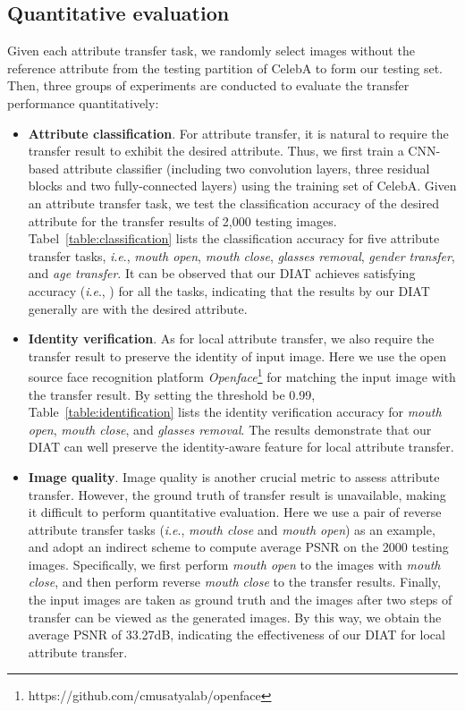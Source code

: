 \documentclass[journal]{IEEEtran}
\newcommand{\ie}{\textit{i}.\textit{e}.}
\begin{document}
\subsection{Quantitative evaluation}
Given each attribute transfer task, we randomly select  images without the reference attribute from the testing partition of CelebA to form our testing set.
Then, three groups of experiments are conducted to evaluate the transfer performance quantitatively:
\begin{itemize}
  \item \textbf{Attribute classification}. For attribute transfer, it is natural to require the transfer result to exhibit the desired attribute.
Thus, we first train a CNN-based attribute classifier (including two convolution layers, three residual blocks and two fully-connected layers) using the training set of CelebA.
Given an attribute transfer task, we test the classification accuracy of the desired attribute for the transfer results of 2,000 testing images.
Tabel~\ref{table:classification} lists the classification accuracy for five attribute transfer tasks, \ie, \emph{mouth open}, \emph{mouth close}, \emph{glasses removal}, \emph{gender transfer}, and \emph{age transfer}.
It can be observed that our DIAT achieves satisfying accuracy (\ie, ) for all the tasks, indicating that the results by our DIAT generally are with the desired attribute.
\item \textbf{Identity verification}. As for local attribute transfer, we also require the transfer result to preserve the identity of input image.
Here we use the open source face recognition platform \emph{Openface}\footnote{https://github.com/cmusatyalab/openface} for matching the input image with the transfer result.
By setting the threshold be 0.99, Table~\ref{table:identification} lists the identity verification accuracy for \emph{mouth open}, \emph{mouth close}, and \emph{glasses removal}.
The results demonstrate that our DIAT can well preserve the identity-aware feature for local attribute transfer.
\item \textbf{Image quality}.
Image quality is another crucial metric to assess attribute transfer.
However, the ground truth of transfer result is unavailable, making it difficult to perform quantitative evaluation.
Here we use a pair of reverse attribute transfer tasks (\ie, \emph{mouth close} and \emph{mouth open}) as an example, and adopt an indirect scheme to compute average PSNR on the 2000 testing images.
Specifically, we first perform \emph{mouth open} to the images with \emph{mouth close}, and then perform reverse \emph{mouth close} to the transfer results.
Finally, the input images are taken as ground truth and the images after two steps of transfer can be viewed as the generated images.
By this way, we obtain the average PSNR of 33.27dB, indicating the effectiveness of our DIAT for local attribute transfer.
\end{itemize}
\end{document}
